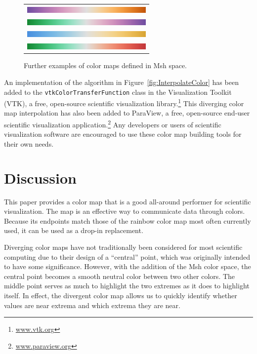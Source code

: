 \documentclass{acmsiggraph}               %
\newcommand{\Msh}{Msh\xspace}
\begin{document}
\begin{figure}
  \centering
  \begin{tabular}{c}
    \includegraphics[width=2.5in]{images/Purple2OrangeBar} \\
    \includegraphics[width=2.5in]{images/Green2PurpleBar} \\
    \includegraphics[width=2.5in]{images/Blue2TanBar} \\
    \includegraphics[width=2.5in]{images/Green2RedDivBar}
  \end{tabular}
  \caption{Further examples of color maps defined in \Msh space.}
  \label{fig:OtherColorMaps}
\end{figure}

An implementation of the  algorithm in
Figure~\ref{fig:InterpolateColor} has been added to the
\texttt{vtkColorTransferFunction} class in the Visualization Toolkit (VTK),
a free, open-source scientific visualization
library.\footnote{\href{http://www.vtk.org}{www.vtk.org}} This diverging
color map interpolation has also been added to ParaView, a free, open-source
end-user scientific visualization
application.\footnote{\href{http://www.paraview.org}{www.paraview.org}}
Any developers or users of scientific visualization software are encouraged
to use these color map building tools for their own needs.


\section{Discussion}
\label{sec:Discussion}

This paper provides a color map that is a good all-around performer for
scientific visualization.  The map is an effective way to communicate data
through colors.  Because its endpoints match those of the rainbow
color map most often currently used, it can be used as a drop-in
replacement.

Diverging color maps have not traditionally been considered for most
scientific computing due to their design of a ``central'' point, which was
originally intended to have some significance.  However, with the addition
of the \Msh color space, the central point becomes a smooth neutral color
between two other colors.  The middle point serves as much to highlight the
two extremes as it does to highlight itself.  In effect, the divergent
color map allows us to quickly identify whether values are near extrema and
which extrema they are near.
\end{document}

